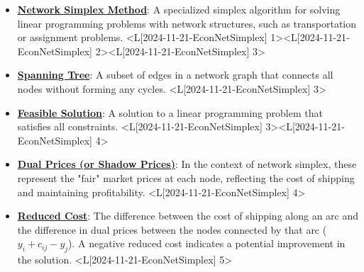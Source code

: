 \documentclass{article}%
\begin{document}
\begin{itemize}[[leftmargin=*]]%
\item \href{https://www.math.purdue.edu/~yipn/421/2024-11-21-EconNetSimplex.pdf#page=1}{\textbf{Network Simplex Method}}: A specialized simplex algorithm for solving linear programming problems with network structures, such as transportation or assignment problems. <L[2024-11-21-EconNetSimplex] 1><L[2024-11-21-EconNetSimplex] 2><L[2024-11-21-EconNetSimplex] 3>%
\item \href{https://www.math.purdue.edu/~yipn/421/2024-11-21-EconNetSimplex.pdf#page=3}{\textbf{Spanning Tree}}: A subset of edges in a network graph that connects all nodes without forming any cycles. <L[2024-11-21-EconNetSimplex] 3>%
\item \href{https://www.math.purdue.edu/~yipn/421/2024-11-21-EconNetSimplex.pdf#page=3}{\textbf{Feasible Solution}}: A solution to a linear programming problem that satisfies all constraints. <L[2024-11-21-EconNetSimplex] 3><L[2024-11-21-EconNetSimplex] 4>%
\item \href{https://www.math.purdue.edu/~yipn/421/2024-11-21-EconNetSimplex.pdf#page=4}{\textbf{Dual Prices (or Shadow Prices)}}: In the context of network simplex, these represent the "fair" market prices at each node, reflecting the cost of shipping and maintaining profitability. <L[2024-11-21-EconNetSimplex] 4>%
\item \href{https://www.math.purdue.edu/~yipn/421/2024-11-21-EconNetSimplex.pdf#page=5}{\textbf{Reduced Cost}}: The difference between the cost of shipping along an arc and the difference in dual prices between the nodes connected by that arc ($y_i + c_{ij} - y_j$). A negative reduced cost indicates a potential improvement in the solution. <L[2024-11-21-EconNetSimplex] 5>%
\end{itemize}%
\end{document}
